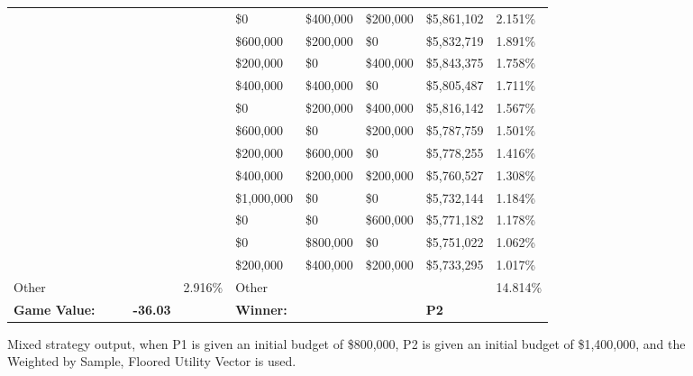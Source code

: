 \documentclass[11pt]{article}
\begin{document}
\begin{figure}
\begin{tabular}{ |p{1.0cm}p{1.0cm}p{1.0cm}p{2.0cm}|p{1.0cm}||p{1.0cm}p{1.0cm}p{1.0cm}p{2.0cm}|p{1.0cm}|}
&&&&&\$0 & \$400,000 & \$200,000 & \$5,861,102 & 2.151\% \\
&&&&&\$600,000 & \$200,000 & \$0 & \$5,832,719 & 1.891\% \\
&&&&&\$200,000 & \$0 & \$400,000 & \$5,843,375 & 1.758\% \\
&&&&&\$400,000 & \$400,000 & \$0 & \$5,805,487 & 1.711\% \\
&&&&&\$0 & \$200,000 & \$400,000 & \$5,816,142 & 1.567\% \\
&&&&&\$600,000 & \$0 & \$200,000 & \$5,787,759 & 1.501\% \\
&&&&&\$200,000 & \$600,000 & \$0 & \$5,778,255 & 1.416\% \\
&&&&&\$400,000 & \$200,000 & \$200,000 & \$5,760,527 & 1.308\% \\
&&&&&\$1,000,000 & \$0 & \$0 & \$5,732,144 & 1.184\% \\
&&&&&\$0 & \$0 & \$600,000 & \$5,771,182 & 1.178\% \\
&&&&&\$0 & \$800,000 & \$0 & \$5,751,022 & 1.062\% \\
&&&&&\$200,000 & \$400,000 & \$200,000 & \$5,733,295 & 1.017\% \\
\hline
Other &&&& 2.916\% & Other &&&& 14.814\% \\
\hline
\small \textbf{Game Value:} &&& \small \textbf{-36.03} && \small \textbf{Winner:} &&& \small \textbf{P2}&\\
\hline
\end{tabular}
\caption{Mixed strategy output, when P1 is given an initial budget of \$800,000, P2 is given an initial budget of \$1,400,000, and the Weighted by Sample, Floored Utility Vector is used.}
\label{8v14table.3}
\end{figure}
\end{document}
